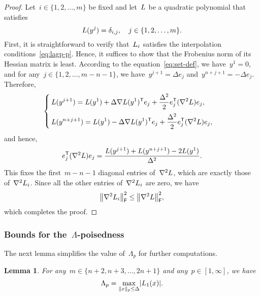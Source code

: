 \documentclass[draft]{article}
\numberwithin{equation}{section}
\theoremstyle{definition}
\theoremstyle{plain}
\newtheorem{lemma}{Lemma}[section]
\newcommand{\abs}[2][]{#1\lvert#2#1\rvert}
\newcommand{\lagp}[1][]{L\ifblank{#1}{}{_{#1}}}
\newcommand{\norm}[2][]{#1\lVert#2#1\rVert}
\newcommand{\set}[2][]{#1\{#2#1\}}
\newcommand{\T}{\mathsf{T}}
\begin{document}
\begin{proof}
    Let~$i \in \set{1, 2, \dots, m}$ be fixed and let~$\lagp$ be a quadratic polynomial that satisfies
    \begin{equation}
        \label{eq:lagp-p}
        \lagp(y^j) = \delta_{i, j}, \quad j \in \set{1, 2, \dots, m}.
    \end{equation}
    First, it is straightforward to verify that~$\lagp[i]$ satisfies the interpolation conditions~\eqref{eq:lagp-p}.
    Hence, it suffices to show that the Frobenius norm of its Hessian matrix is least.
    According to the equation~\eqref{eq:set-def}, we have~$y^1 = 0$, and for any~$j \in \set{1, 2, \dots, m - n - 1}$, we have~$y^{j + 1} = \Delta e_j$ and~$y^{n + j + 1} = -\Delta e_j$.
    Therefore,
    \begin{equation*}
        \begin{cases}
            \displaystyle \lagp(y^{j + 1}) = \lagp(y^1) + \Delta \nabla \lagp(y^1)^{\T} e_j + \frac{\Delta^2}{2} e_j^{\T} (\nabla^2 \lagp) e_j,\\[2ex]
            \displaystyle \lagp(y^{n + j + 1}) = \lagp(y^1) - \Delta \nabla \lagp(y^1)^{\T} e_j + \frac{\Delta^2}{2} e_j^{\T} (\nabla^2 \lagp) e_j,
        \end{cases}
    \end{equation*}
    and hence,
    \begin{equation*}
        e_j^{\T} (\nabla^2 \lagp) e_j = \frac{\lagp(y^{j + 1}) + \lagp(y^{n + j + 1}) - 2 \lagp(y^1)}{\Delta^2}.
    \end{equation*}
    This fixes the first~$m - n - 1$ diagonal entries of~$\nabla^2 \lagp$, which are exactly those of~$\nabla^2 \lagp[i]$.
    Since all the other entries of~$\nabla^2 \lagp[i]$ are zero, we have
    \begin{equation*}
        \norm[\big]{\nabla^2 \lagp[i]}_{\mathsf{F}}^2 \le \norm[\big]{\nabla^2 \lagp}_{\mathsf{F}}^2,
    \end{equation*}
    which completes the proof.
\end{proof}

\subsubsection{Bounds for the~\texorpdfstring{$\Lambda$}{\textLambda}-poisedness}

The next lemma simplifies the value of~$\Lambda_p$ for further computations.

\begin{lemma}
    \label{lem:lambda-p}
    For any~$m \in \set{n + 2, n + 3, \dots, 2n + 1}$ and any~$p \in [1, \infty]$, we have
    \begin{equation}
        \label{eq:lambda-p}
        \Lambda_p = \max_{\norm{x}_p \le \Delta} \abs{\lagp[1](x)}.
    \end{equation}
\end{lemma}
\end{document}
